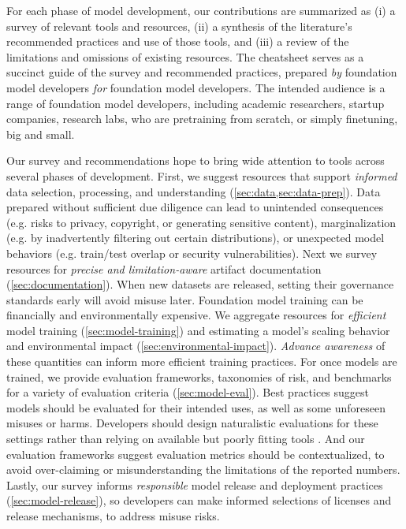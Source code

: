 For each phase of model development, our contributions are summarized as (i) a survey of relevant tools and resources, (ii) a synthesis of the literature's recommended practices and use of those tools, and (iii) a review of the limitations and omissions of existing resources.
The cheatsheet serves as a succinct guide of the survey and recommended practices, prepared \emph{by} foundation model developers \emph{for} foundation model developers.
The intended audience is a range of foundation model developers, including academic researchers, startup companies, research labs, who are pretraining from scratch, or simply finetuning, big and small.

Our survey and recommendations hope to bring wide attention to tools across several phases of development.
First, we suggest resources that support \emph{informed} data selection, processing, and understanding (\cref{sec:data,sec:data-prep}).
Data prepared without sufficient due diligence can lead to unintended consequences (e.g. risks to privacy, copyright, or generating sensitive content), marginalization (e.g. by inadvertently filtering out certain distributions), or unexpected model behaviors (e.g. train/test overlap or security vulnerabilities). 
Next we survey resources for \emph{precise and limitation-aware} artifact documentation (\cref{sec:documentation}).
When new datasets are released, setting their governance standards early will avoid misuse later.
Foundation model training can be financially and environmentally expensive.
We aggregate resources for \emph{efficient} model training (\cref{sec:model-training}) and estimating a model's scaling behavior and environmental impact (\cref{sec:environmental-impact}).
\emph{Advance awareness} of these quantities can inform more efficient training practices.
For once models are trained, we provide evaluation frameworks, taxonomies of risk, and benchmarks for a variety of evaluation criteria (\cref{sec:model-eval}).
Best practices suggest models should be evaluated for their intended uses, as well as some unforeseen misuses or harms.
Developers should design naturalistic evaluations for these settings rather than relying on available but poorly fitting tools \citep{biderman2024lessons,liao2023rethinking}.
And our evaluation frameworks suggest evaluation metrics should be contextualized, to avoid over-claiming or misunderstanding the limitations of the reported numbers.
Lastly, our survey informs \emph{responsible} model release and deployment practices (\cref{sec:model-release}), so developers can make informed selections of licenses and release mechanisms, to address misuse risks.


